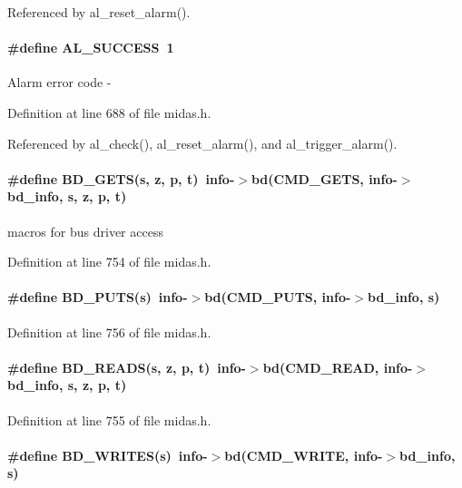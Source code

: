 Referenced by al\_\-reset\_\-alarm().
\paragraph[{AL\_\-SUCCESS}]{\setlength{\rightskip}{0pt plus 5cm}\#define AL\_\-SUCCESS~1}\hfill\label{group__err26_ga5bf38fa7fcb948150030918ced138deb}
Alarm error code -\/ 

Definition at line 688 of file midas.h.

Referenced by al\_\-check(), al\_\-reset\_\-alarm(), and al\_\-trigger\_\-alarm().
\paragraph[{BD\_\-GETS}]{\setlength{\rightskip}{0pt plus 5cm}\#define BD\_\-GETS(s, \/  z, \/  {\bf p}, \/  t)~info-\/$>$bd(CMD\_\-GETS, info-\/$>$bd\_\-info, s, z, {\bf p}, t)}\hfill\label{group__err26_ga834400e6d1a88da1ea5e83b5e50675af}
macros for bus driver access 

Definition at line 754 of file midas.h.
\paragraph[{BD\_\-PUTS}]{\setlength{\rightskip}{0pt plus 5cm}\#define BD\_\-PUTS(s)~info-\/$>$bd(CMD\_\-PUTS, info-\/$>$bd\_\-info, s)}\hfill\label{group__err26_ga1b431a54be378a8885d1ad004eaaf42d}


Definition at line 756 of file midas.h.
\paragraph[{BD\_\-READS}]{\setlength{\rightskip}{0pt plus 5cm}\#define BD\_\-READS(s, \/  z, \/  {\bf p}, \/  t)~info-\/$>$bd(CMD\_\-READ, info-\/$>$bd\_\-info, s, z, {\bf p}, t)}\hfill\label{group__err26_gaadfe3103fa652a7d67768794bcf5caa0}


Definition at line 755 of file midas.h.
\paragraph[{BD\_\-WRITES}]{\setlength{\rightskip}{0pt plus 5cm}\#define BD\_\-WRITES(s)~info-\/$>$bd(CMD\_\-WRITE, info-\/$>$bd\_\-info, s)}\hfill\label{group__err26_ga788c0dd0929003bbcab82323451b45bc}


